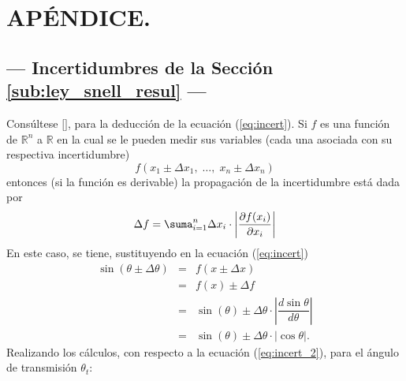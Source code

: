 \documentclass[12pt,a4paper]{article}
\begin{document}




\section{APÉNDICE.} %

\subsection{--- Incertidumbres de la Sección \ref{sub:ley_snell_resul} ---} %
\label{sub:incert_snell}
Consúltese \([\)\cite{incert}\(]\), para la deducción de la ecuación (\ref{eq:incert}). Si $f$ es una función de $\mathds{R}^n$ a $\mathds{R}$ en la cual se le pueden medir sus variables (cada una asociada con su respectiva incertidumbre)
$$f(x_1\pm\Delta x_1, \;\ldots,\; x_n \pm \Delta x_n)$$
entonces (si la función es derivable) la propagación de la incertidumbre está dada por 
\begin{equation}
	\Delta f=\displaystyle\suma_{i=1}^n\Delta x_i\cdot\left|\dfrac{\partial f(x_i)}{\partial x_i}\right|
	\label{eq:incert}
\end{equation}
En este caso, se tiene, sustituyendo en la ecuación (\ref{eq:incert})
\begin{equation}
	\begin{array}{rcl}
		\sin (\theta \pm \Delta \theta) & = & f(x\pm \Delta x) \\[2mm]
		& = & f(x) \pm \Delta f \\[2mm]
		& = & \sin (\theta) \pm \Delta \theta \cdot \left| \dfrac{d \sin \theta}{d \theta} \right| \\[5mm]
		& = & \sin (\theta) \pm \Delta \theta \cdot \big| \cos \theta \big| .
	\end{array}
	\label{eq:incert_2}
\end{equation}
Realizando los cálculos, con respecto a la ecuación (\ref{eq:incert_2}), para el ángulo de transmisión $\theta_t$:
\end{document}
